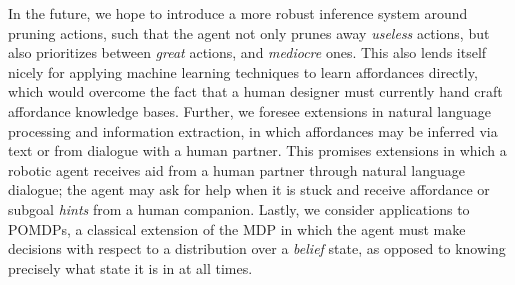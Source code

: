 \documentclass[]{article}
\begin{document}
In the future, we hope to introduce a more robust inference system around pruning actions, such that
the agent not only prunes away {\it useless} actions, but also prioritizes between
{\it great} actions, and {\it mediocre} ones. This also lends itself nicely for applying
machine learning techniques to learn affordances directly, which would 
overcome the fact that a human designer must currently hand craft affordance knowledge bases.
Further, we foresee extensions in natural language processing and information
extraction, in which affordances may be inferred via text or from dialogue with a human partner.
This promises extensions in which a robotic agent receives aid from a human partner through natural language
dialogue; the agent may ask for help when it is stuck and
receive affordance or subgoal {\it hints} from a human companion. Lastly, we consider applications to
POMDPs, a classical extension of the MDP in which the agent must make decisions with respect to a distribution over a {\it belief} state,
as opposed to knowing precisely what state it is in at all times.


  
\end{document}
